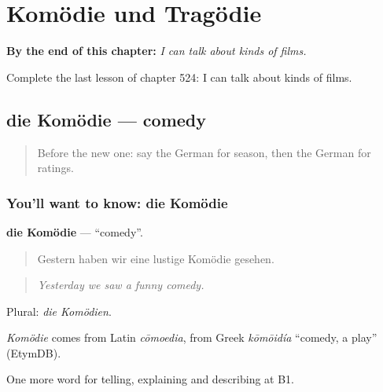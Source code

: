 
\chapter{Komödie und Tragödie}
\label{ch:ge-komodie-und-tragodie}

\begin{chapteropening}
\textbf{By the end of this chapter:} \emph{I can talk about kinds of films.}

Complete the last lesson of chapter 524: I can talk about kinds of films.
\end{chapteropening}

\section[die Komödie]{die Komödie — comedy}

\label{lesson:GE-C524-komoedie}



\begin{quote}
Before the new one: say the German for season, then the German for ratings.
\end{quote}

\subsection*{You'll want to know: die Komödie}
\textbf{die Komödie} — \textquotedblleft{}comedy\textquotedblright{}.

\begin{quote}
Gestern haben wir eine lustige Komödie gesehen.
\end{quote}

\begin{quote}
\emph{Yesterday we saw a funny comedy.}
\end{quote}

Plural: \emph{die Komödien}.

\begin{cousinweb}
\emph{Komödie} comes from Latin \emph{cōmoedia}, from Greek \emph{kōmōidía} \textquotedblleft{}comedy, a play\textquotedblright{} (EtymDB).
\end{cousinweb}

\begin{grammarlens}[title={What you've built}]
One more word for telling, explaining and describing at B1.
\end{grammarlens}

